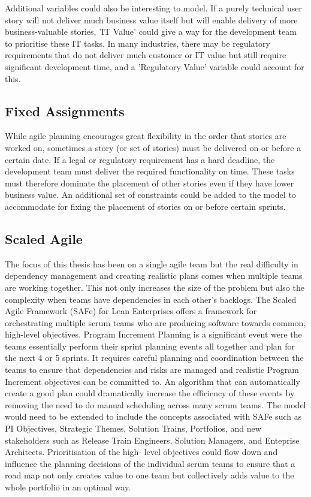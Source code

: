Additional variables could also be interesting to model. If a purely technical user story will not deliver much business value itself but will enable delivery of more business-valuable stories, 'IT Value' could give a way for the development team to prioritise these IT tasks. In many industries, there may be regulatory requirements that do not deliver much customer or IT value but still require significant development time, and a 'Regulatory Value' variable could account for this.

\subsection{Fixed Assignments}
While agile planning encourages great flexibility in the order that stories are worked on, sometimes a story (or set of stories) must be delivered on or before a certain date. If a legal or regulatory requirement has a hard deadline, the development team must deliver the required functionality on time. These tasks must therefore dominate the placement of other stories even if they have lower business value. An additional set of constraints could be added to the model to accommodate for fixing the placement of stories on or before certain sprints.

\subsection{Scaled Agile}
The focus of this thesis has been on a single agile team but the real difficulty in dependency management and creating realistic plans comes when multiple teams are working together. This not only increases the size of the problem but also the complexity when teams have dependencies in each other's backlogs. The Scaled Agile Framework (SAFe) for Lean Enterprises \citep{scaled_agile_inc_2018} offers a framework for orchestrating multiple scrum teams who are producing software towards common, high-level objectives. Program Increment Planning is a significant event were the teams essentially perform their sprint planning events all together and plan for the next 4 or 5 sprints. It requires careful planning and coordination between the teams to ensure that dependencies and risks are managed and realistic Program Increment objectives can be committed to. An algorithm that can automatically create a good plan could dramatically increase the efficiency of these events by removing the need to do manual scheduling across many scrum teams. The model would need to be extended to include the concepts associated with SAFe such as PI Objectives, Strategic Themes, Solution Trains, Portfolios, and new stakeholders such as Release Train Engineers, Solution Managers, and Enteprise Architects. Prioritisation of the high- level objectives could flow down and influence the planning decisions of the individual scrum teams to ensure that a road map not only creates value to one team but collectively adds value to the whole portfolio in an optimal way.

